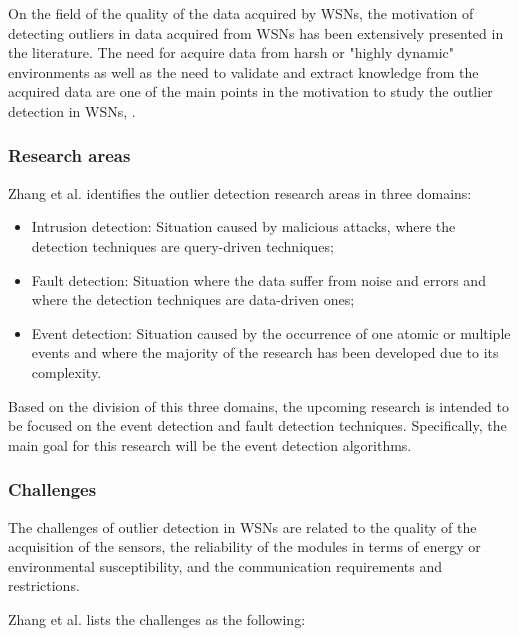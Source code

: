 On the field of the quality of the data acquired by WSNs, the motivation of detecting outliers in data acquired from WSNs has been extensively presented in the literature. The need for acquire data from harsh or "highly dynamic" environments as well as the need to validate and extract knowledge from the acquired data are one of the main points in the motivation to study the outlier detection in WSNs,  \cite{gen:zhang:2010,gen:chandola:2009,stat:ghorbel:2015,class:martins:2015b}.



\subsubsection{Research areas}
Zhang et al. \cite{gen:zhang:2010} identifies the outlier detection research areas in three domains: 

\begin{itemize}
	\item Intrusion detection: Situation caused by malicious attacks, where the detection techniques are query-driven techniques;
	
	\item Fault detection: Situation where the data suffer from noise and errors and where the detection techniques are data-driven ones;
	
	\item Event detection: Situation caused by the occurrence of one atomic or multiple events and where the majority of the research has been developed due to its complexity.
\end{itemize}

Based on the division of this three domains, the upcoming research is intended to be focused on the event detection and fault detection techniques. Specifically, the main goal for this research will be the event detection algorithms.


\subsubsection{Challenges}

The challenges of outlier detection in WSNs are related to the quality of the acquisition of the sensors, the reliability of the modules in terms of energy or environmental susceptibility, and the communication requirements and restrictions.

Zhang et al. \cite{gen:zhang:2010} lists the challenges as the following:

